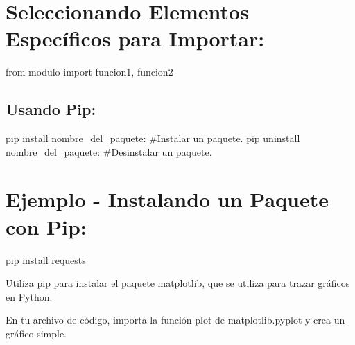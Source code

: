 \documentclass[
  a4paper,
  DIV=11,
  numbers=noendperiod,
  onepage,
  openany]{scrreprt}
\newenvironment{Shaded}{\begin{snugshade}}{\end{snugshade}}
\newcommand{\CommentTok}[1]{\textcolor[rgb]{0.37,0.37,0.37}{#1}}
\newcommand{\ExtensionTok}[1]{\textcolor[rgb]{0.00,0.23,0.31}{#1}}
\newcommand{\ImportTok}[1]{\textcolor[rgb]{0.00,0.46,0.62}{#1}}
\newcommand{\NormalTok}[1]{\textcolor[rgb]{0.00,0.23,0.31}{#1}}
\begin{document}
\hypertarget{seleccionando-elementos-especuxedficos-para-importar-2}{%
\section{Seleccionando Elementos Específicos para
Importar:}\label{seleccionando-elementos-especuxedficos-para-importar-2}}

\begin{Shaded}
\begin{Highlighting}[]
\ImportTok{from}\NormalTok{ modulo }\ImportTok{import}\NormalTok{ funcion1, funcion2}
\end{Highlighting}
\end{Shaded}

\hypertarget{usando-pip}{%
\subsection{Usando Pip:}\label{usando-pip}}

\begin{Shaded}
\begin{Highlighting}[]
\ExtensionTok{pip}\NormalTok{ install nombre\_del\_paquete: }\CommentTok{\#Instalar un paquete.}
\ExtensionTok{pip}\NormalTok{ uninstall nombre\_del\_paquete: }\CommentTok{\#Desinstalar un paquete.}
\end{Highlighting}
\end{Shaded}

\hypertarget{ejemplo---instalando-un-paquete-con-pip}{%
\section{Ejemplo - Instalando un Paquete con
Pip:}\label{ejemplo---instalando-un-paquete-con-pip}}

\begin{Shaded}
\begin{Highlighting}[]
\ExtensionTok{pip}\NormalTok{ install requests}
\end{Highlighting}
\end{Shaded}

\begin{tcolorbox}[enhanced jigsaw, colbacktitle=quarto-callout-important-color!10!white, toprule=.15mm, leftrule=.75mm, titlerule=0mm, opacityback=0, rightrule=.15mm, opacitybacktitle=0.6, breakable, left=2mm, coltitle=black, title=\textcolor{quarto-callout-important-color}{\faExclamation}\hspace{0.5em}{Actividad Práctica:}, toptitle=1mm, bottomtitle=1mm, arc=.35mm, bottomrule=.15mm, colback=white, colframe=quarto-callout-important-color-frame]

Utiliza pip para instalar el paquete matplotlib, que se utiliza para
trazar gráficos en Python.

En tu archivo de código, importa la función plot de matplotlib.pyplot y
crea un gráfico simple.

\end{tcolorbox}
\end{document}
